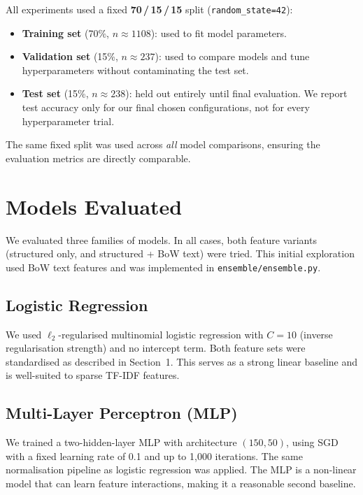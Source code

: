 \documentclass[11pt,letterpaper]{article}
\begin{document}
All experiments used a fixed \textbf{70\,/\,15\,/\,15} split
(\texttt{random\_state=42}):

\begin{itemize}
  \item \textbf{Training set} (70\%, $n\approx1108$): used to fit model parameters.
  \item \textbf{Validation set} (15\%, $n\approx237$): used to compare models and
        tune hyperparameters without contaminating the test set.
  \item \textbf{Test set} (15\%, $n\approx238$): held out entirely until final
        evaluation. We report test accuracy only for our final chosen configurations,
        not for every hyperparameter trial.
\end{itemize}

The same fixed split was used across \emph{all} model comparisons, ensuring the
evaluation metrics are directly comparable.

\section{Models Evaluated}

We evaluated three families of models. In all cases, both feature variants
(structured only, and structured + BoW text) were tried. This initial exploration
used BoW text features and was implemented in \texttt{ensemble/ensemble.py}.

\subsection{Logistic Regression}
We used $\ell_2$-regularised multinomial logistic regression with $C = 10$
(inverse regularisation strength) and no intercept term.  Both feature sets
were standardised as described in Section~1.  This serves as a strong linear
baseline and is well-suited to sparse TF-IDF features.

\subsection{Multi-Layer Perceptron (MLP)}
We trained a two-hidden-layer MLP with architecture $(150, 50)$, using SGD with
a fixed learning rate of 0.1 and up to 1{,}000 iterations.  The same
normalisation pipeline as logistic regression was applied.  The MLP is a
non-linear model that can learn feature interactions, making it a reasonable
second baseline.
\end{document}
